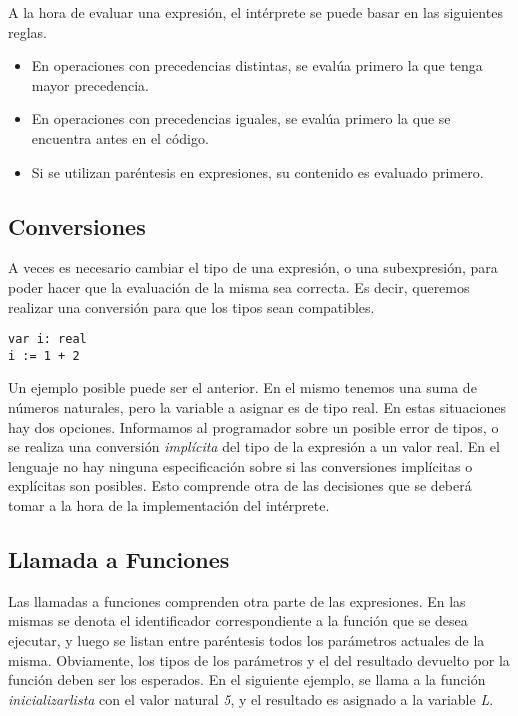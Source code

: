 \documentclass{article}
\begin{document}
A la hora de evaluar una expresión, el intérprete se puede basar en las siguientes reglas.

\begin{itemize}
\item En operaciones con precedencias distintas, se evalúa primero la que tenga mayor precedencia.
\item En operaciones con precedencias iguales, se evalúa primero la que se encuentra antes en el código.
\item Si se utilizan paréntesis en expresiones, su contenido es evaluado primero.
\end{itemize}

\subsection{Conversiones}

A veces es necesario cambiar el tipo de una expresión, o una subexpresión, para poder hacer que la evaluación de la misma sea correcta.
Es decir, queremos realizar una conversión para que los tipos sean compatibles.

\begin{lstlisting}
var i: real
i := 1 + 2
\end{lstlisting}

Un ejemplo posible puede ser el anterior.
En el mismo tenemos una suma de números naturales, pero la variable a asignar es de tipo real.
En estas situaciones hay dos opciones.
Informamos al programador sobre un posible error de tipos, o se realiza una conversión \textit{implícita} del tipo de la expresión a un valor real.
En el lenguaje no hay ninguna especificación sobre si las conversiones implícitas o explícitas son posibles.
Esto comprende otra de las decisiones que se deberá tomar a la hora de la implementación del intérprete.

\subsection{Llamada a Funciones}

Las llamadas a funciones comprenden otra parte de las expresiones.
En las mismas se denota el identificador correspondiente a la función que se desea ejecutar, y luego se listan entre paréntesis todos los parámetros actuales de la misma.
Obviamente, los tipos de los parámetros y el del resultado devuelto por la función
deben ser los esperados.
En el siguiente ejemplo, se llama a la función \textit{inicializar\gbajo lista} con el valor natural \textit{5}, y el resultado es asignado a la variable \textit{L}.
\end{document}
